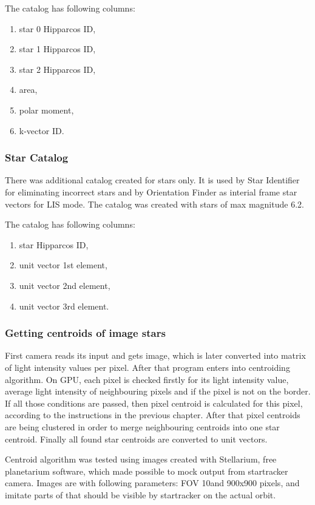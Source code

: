 \documentclass[12pt,a4paper,oneside]{article}
\begin{document}
The catalog has following columns:
\begin{enumerate}[noitemsep]
\item star 0 Hipparcos ID, 
\item star 1 Hipparcos ID,
\item star 2 Hipparcos ID,
\item area,
\item polar moment,
\item k-vector ID.
\end{enumerate}

\subsubsection{Star Catalog}

There was additional catalog created for stars only. It is used by Star Identifier for eliminating incorrect stars and by Orientation Finder as interial frame star vectors for LIS mode. The catalog was created with stars of max magnitude 6.2.

The catalog has following columns:
\begin{enumerate}[noitemsep]
\item star Hipparcos ID,
\item unit vector 1st element,
\item unit vector 2nd element, 
\item unit vector 3rd element.
\end{enumerate}

\subsubsection{Getting centroids of image stars}

First camera reads its input and gets image, which is later converted into matrix of light intensity values per pixel. After that program enters into centroiding algorithm. On GPU, each pixel is checked firstly for its light intensity value, average light intensity of neighbouring pixels and if the pixel is not on the border. If all those conditions are passed, then pixel centroid is calculated for this pixel, according to the instructions in the previous chapter. After that pixel centroids are being clustered in order to merge neighbouring centroids into one star centroid. Finally all found star centroids are converted to unit vectors.

Centroid algorithm was tested using images created with Stellarium, free planetarium software, which made possible to mock output from startracker camera. Images are with following parameters: FOV 10\degree and 900x900 pixels, and imitate parts of that should be visible by startracker on the actual orbit.
\end{document}
